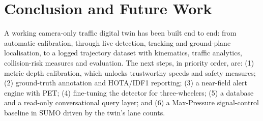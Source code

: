 \documentclass[11pt,a4paper]{article}
\begin{document}
\section{Conclusion and Future Work}
A working camera-only traffic digital twin has been built end to end: from automatic calibration, through live detection,
tracking and ground-plane localisation, to a logged trajectory dataset with kinematics, traffic analytics, collision-risk
measures and evaluation. The next steps, in priority order, are:
(1) metric depth calibration, which unlocks trustworthy speeds and safety measures;
(2) ground-truth annotation and HOTA/IDF1 reporting;
(3) a near-field alert engine with PET;
(4) fine-tuning the detector for three-wheelers;
(5) a database and a read-only conversational query layer; and
(6) a Max-Pressure signal-control baseline in SUMO driven by the twin's lane counts.
\end{document}
